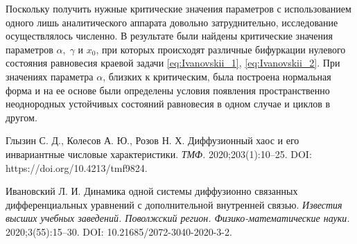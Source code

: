 \documentclass[12pt]{report}
\begin{document}
Поскольку получить нужные критические значения параметров с использованием одного лишь аналитического аппарата довольно затруднительно, исследование осуществлялось численно. В результате были найдены критические значения параметров $ \alpha, \; \gamma $ и $ x_0 $, при которых происходят различные бифуркации нулевого состояния равновесия краевой задачи \eqref{eq:Ivanovskii_1}, \eqref{eq:Ivanovskii_2}. При значениях параметра $ \alpha $, близких к критическим, была построена нормальная форма и на ее основе были определены условия появления пространственно неоднородных устойчивых состояний равновесия в одном случае и циклов в другом.


\begin{thebibliography}{9}

Глызин С. Д., Колесов А. Ю., Розов Н. Х. Диффузионный хаос и его инвариантные числовые характеристики. {\it ТМФ. } 2020;203(1):10–25. DOI: https://doi.org/10.4213/tmf9824. 

Ивановский Л. И. Динамика одной системы диффузионно связанных дифференциальных уравнений с дополнительной внутренней связью. {\it Известия высших учебных заведений. Поволжский регион. Физико-математические науки.} 2020;3(55):15–30. DOI: 10.21685/2072-3040-2020-3-2.

\end{thebibliography}
\end{document}
